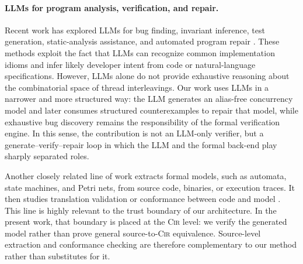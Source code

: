 \paragraph{LLMs for program analysis, verification, and repair.}
Recent work has explored LLMs for bug finding, invariant inference, test generation, static-analysis assistance, and automated program repair \cite{Chen2021CodeLLMs,Fan2023RepairFromLLMs,Xia2023APRLLMs,Bouzenia2025RepairAgent,Li2025ContextAwarePrompting}. These methods exploit the fact that LLMs can recognize common implementation idioms and infer likely developer intent from code or natural-language specifications. However, LLMs alone do not provide exhaustive reasoning about the combinatorial space of thread interleavings. Our work uses LLMs in a narrower and more structured way: the LLM generates an alias-free concurrency model and later consumes structured counterexamples to repair that model, while exhaustive bug discovery remains the responsibility of the formal verification engine. In this sense, the contribution is not an LLM-only verifier, but a generate--verify--repair loop in which the LLM and the formal back-end play sharply separated roles.


Another closely related line of work extracts formal models, such as automata, state machines, and Petri nets, from source code, binaries, or execution traces. It then studies translation validation or conformance between code and model \cite{Ball2002SLAM,Henzinger2003BLAST,Beyer2011CPAchecker,Necula2000TranslationValidation}. This line is highly relevant to the trust boundary of our architecture. In the present work, that boundary is placed at the \textsc{Cir} level: we verify the generated model rather than prove general source-to-\textsc{Cir} equivalence. Source-level extraction and conformance checking are therefore complementary to our method rather than substitutes for it. 
